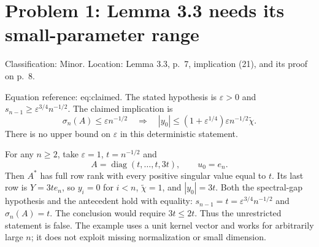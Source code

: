 \documentclass[10pt]{article}
\begin{document}
\section*{Problem 1: Lemma 3.3 needs its small-parameter range}
Classification: Minor. Location: Lemma 3.3, p. 7, implication (21), and its proof on p. 8.\par
Equation reference: eq:claimed. The stated hypothesis is \(\varepsilon>0\) and \(s_{n-1}\geq \varepsilon^{3/4}n^{-1/2}\). The claimed implication is \[\sigma_n(A)\leq \varepsilon n^{-1/2}
 \quad\Longrightarrow\quad
 |y_0|\leq (1+\varepsilon^{1/4})\varepsilon n^{-1/2}\widetilde\chi .
 \] There is no upper bound on \(\varepsilon\) in this deterministic statement.\par
For any \(n\geq2\), take \(\varepsilon=1\), \(t=n^{-1/2}\) and \[A=\operatorname{diag}(t,\ldots,t,3t),\qquad u_0=e_n.\] Then \(A^*\) has full row rank with every positive singular value equal to \(t\). Its last row is \(Y=3te_n\), so \(y_i=0\) for \(i<n\), \(\widetilde\chi=1\), and \(|y_0|=3t\). Both the spectral-gap hypothesis and the antecedent hold with equality: \(s_{n-1}=t=\varepsilon^{3/4}n^{-1/2}\) and \(\sigma_n(A)=t\). The conclusion would require \(3t\leq2t\). Thus the unrestricted statement is false. The example uses a unit kernel vector and works for arbitrarily large \(n\); it does not exploit missing normalization or small dimension.\par
\end{document}
